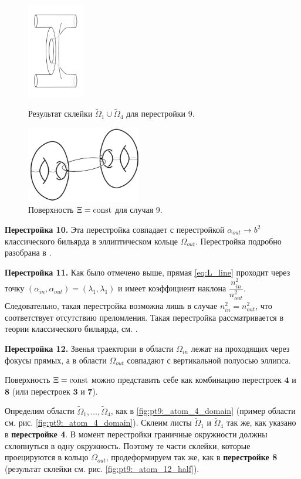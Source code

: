 \begin{figure}[!htb]
\centering
\includegraphics[width=2.5cm]{images/ch4/section2/atoms/atom_9_step.pdf}
\caption{Результат склейки $\widetilde{\Omega}_1 \cup \widetilde{\Omega}_4$ для перестройки 9.}
\label{fig:pt9:_atom_9_step}
\endminipage\hfill
{}
\centering
\includegraphics[width=5cm]{images/ch4/section2/atoms/atom_9.pdf}
\caption{Поверхность $\Xi = \mathrm{const}$ для случая 9.}
\label{fig:pt9:_atom_9}
\endminipage\hfill
\end{figure}

\textbf{Перестройка 10.}
Эта перестройка совпадает с перестройкой $\alpha_{out} \to b^2$ классического бильярда в эллиптическом кольце $\Omega_{out}$. Перестройка подробно разобрана в \cite[\S 3]{Fok15}.

\textbf{Перестройка 11.}
Как было отмечено выше, прямая \eqref{eq:L_line} проходит через точку $(\alpha_{in}, \alpha_{out}) = (\lambda_1, \lambda_1)$ и имеет коэффициент наклона $\dfrac{n_{in}^2}{n_{out}^2}$. 
Следовательно, такая перестройка возможна лишь в случае $n_{in}^2 = n_{out}^2$, что соответствует отсутствию преломления. Такая перестройка рассматривается в теории классического бильярда, см. \cite[\S 3]{Fok15}.

\textbf{Перестройка 12.}
Звенья траектории в области $\Omega_{in}$ лежат на проходящих через фокусы прямых, а в области $\Omega_{out}$ совпадают с вертикальной полуосью эллипса. 

Поверхность $\Xi = \mathrm{const}$ можно представить себе как комбинацию перестроек $\textbf{4}$ и $\textbf{8}$ (или перестроек $\textbf{3}$ и $\textbf{7}$). 

Определим области $\widetilde{\Omega}_1, \ldots, \widetilde{\Omega}_4$, как в \eqref{fig:pt9:_atom_4_domain} (пример области см. рис. \ref{fig:pt9:_atom_4_domain}).
Склеим листы $\widetilde{\Omega}_1$ и  $\widetilde{\Omega}_4$ так же, как указано в \textbf{перестройке 4}. В момент перестройки граничные окружности должны схлопнуться в одну окружность. Поэтому те части склейки, которые проецируются в кольцо $\Omega_{out}$, продеформируем так же, как в \textbf{перестройке 8} (результат склейки см. рис. \ref{fig:pt9:_atom_12_half}).

